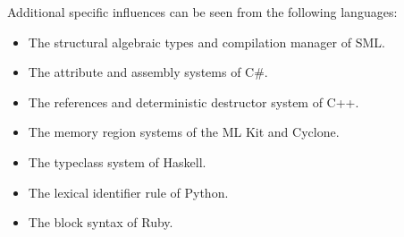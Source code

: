 \documentclass[]{article}
\begin{document}
Additional specific influences can be seen from the following languages:

\begin{itemize}
\itemsep1pt\parskip0pt
\item
  The structural algebraic types and compilation manager of SML.
\item
  The attribute and assembly systems of C\#.
\item
  The references and deterministic destructor system of C++.
\item
  The memory region systems of the ML Kit and Cyclone.
\item
  The typeclass system of Haskell.
\item
  The lexical identifier rule of Python.
\item
  The block syntax of Ruby.
\end{itemize}
\end{document}
